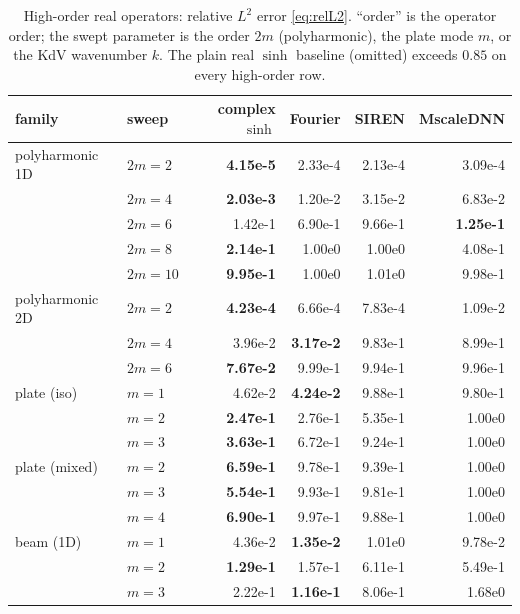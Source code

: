 \begin{table}[htbp]
\centering
\small
\caption{High-order real operators: relative \(L^2\) error \eqref{eq:relL2}.
``order'' is the operator order; the swept parameter is the order \(2m\)
(polyharmonic), the plate mode \(m\), or the KdV wavenumber \(k\). The plain
real \(\sinh\) baseline (omitted) exceeds \(0.85\) on every high-order row.}
\label{tab:res-ho}
\begin{tabular}{@{}llrrrr@{}}
\toprule
family & sweep & complex \(\sinh\) & Fourier & SIREN & MscaleDNN \\
\midrule
polyharmonic 1D & \(2m{=}2\)  & \textbf{4.15e-5} & 2.33e-4 & 2.13e-4 & 3.09e-4 \\
                & \(2m{=}4\)  & \textbf{2.03e-3} & 1.20e-2 & 3.15e-2 & 6.83e-2 \\
                & \(2m{=}6\)  & 1.42e-1 & 6.90e-1 & 9.66e-1 & \textbf{1.25e-1} \\
                & \(2m{=}8\)  & \textbf{2.14e-1} & 1.00e0  & 1.00e0  & 4.08e-1 \\
                & \(2m{=}10\) & \textbf{9.95e-1} & 1.00e0  & 1.01e0  & 9.98e-1 \\
\midrule
polyharmonic 2D & \(2m{=}2\)  & \textbf{4.23e-4} & 6.66e-4 & 7.83e-4 & 1.09e-2 \\
                & \(2m{=}4\)  & 3.96e-2 & \textbf{3.17e-2} & 9.83e-1 & 8.99e-1 \\
                & \(2m{=}6\)  & \textbf{7.67e-2} & 9.99e-1 & 9.94e-1 & 9.96e-1 \\
\midrule
plate (iso)     & \(m{=}1\)   & 4.62e-2 & \textbf{4.24e-2} & 9.88e-1 & 9.80e-1 \\
                & \(m{=}2\)   & \textbf{2.47e-1} & 2.76e-1 & 5.35e-1 & 1.00e0 \\
                & \(m{=}3\)   & \textbf{3.63e-1} & 6.72e-1 & 9.24e-1 & 1.00e0 \\
\midrule
plate (mixed)   & \(m{=}2\)   & \textbf{6.59e-1} & 9.78e-1 & 9.39e-1 & 1.00e0 \\
                & \(m{=}3\)   & \textbf{5.54e-1} & 9.93e-1 & 9.81e-1 & 1.00e0 \\
                & \(m{=}4\)   & \textbf{6.90e-1} & 9.97e-1 & 9.88e-1 & 1.00e0 \\
\midrule
beam (1D)       & \(m{=}1\)   & 4.36e-2 & \textbf{1.35e-2} & 1.01e0  & 9.78e-2 \\
                & \(m{=}2\)   & \textbf{1.29e-1} & 1.57e-1 & 6.11e-1 & 5.49e-1 \\
                & \(m{=}3\)   & 2.22e-1 & \textbf{1.16e-1} & 8.06e-1 & 1.68e0 \\

\end{tabular}
\end{table}

